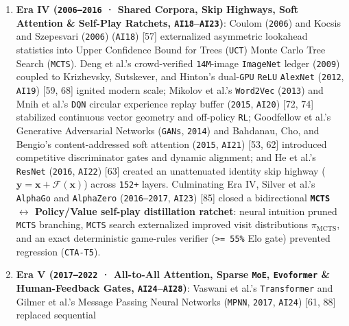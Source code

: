 \documentclass[10pt,letterpaper]{article}
\begin{document}
\begin{enumerate}
  Error Carousel (\texttt{CEC}) protected by multiplicative input,
  forget, and output gates in \([0,1]\) --- \textbf{the exact
  computational analog of a cyanobacterial \texttt{SepJ} nanopore
  (\texttt{CL03})}, sealing stored gradient state against noisy
  read/write perturbations across \texttt{\textgreater{}1,000} recurrent
  steps.
\item
  \textbf{Era IV (\texttt{2006–2016} · Shared Corpora, Skip Highways,
  Soft Attention \& Self-Play Ratchets, \texttt{AI18}--\texttt{AI23})}:
  Coulom (\texttt{2006}) and Kocsis and Szepesvari (\texttt{2006})
  (\texttt{AI18}) {[}57{]} externalized asymmetric lookahead statistics
  into Upper Confidence Bound for Trees (\texttt{UCT}) Monte Carlo Tree
  Search (\texttt{MCTS}). Deng et al.'s crowd-verified
  \texttt{14M}-image \texttt{ImageNet} ledger (\texttt{2009}) coupled to
  Krizhevsky, Sutskever, and Hinton's dual-\texttt{GPU} \texttt{ReLU}
  \texttt{AlexNet} (\texttt{2012}, \texttt{AI19}) {[}59, 68{]} ignited
  modern scale; Mikolov et al.'s \texttt{Word2Vec} (\texttt{2013}) and
  Mnih et al.'s \texttt{DQN} circular experience replay buffer
  (\texttt{2015}, \texttt{AI20}) {[}72, 74{]} stabilized continuous
  vector geometry and off-policy \texttt{RL}; Goodfellow et al.'s
  Generative Adversarial Networks (\texttt{GANs}, \texttt{2014}) and
  Bahdanau, Cho, and Bengio's content-addressed soft attention
  (\texttt{2015}, \texttt{AI21}) {[}53, 62{]} introduced competitive
  discriminator gates and dynamic alignment; and He et al.'s
  \texttt{ResNet} (\texttt{2016}, \texttt{AI22}) {[}63{]} created an
  unattenuated identity skip highway
  (\(\mathbf{y} = \mathbf{x} + \mathcal{F}(\mathbf{x})\)) across
  \texttt{152+} layers. Culminating Era IV, Silver et al.'s
  \texttt{AlphaGo} and \texttt{AlphaZero} (\texttt{2016–2017},
  \texttt{AI23}) {[}85{]} closed a bidirectional \textbf{\texttt{MCTS}
  \(\leftrightarrow\) Policy/Value self-play distillation ratchet}:
  neural intuition pruned \texttt{MCTS} branching, \texttt{MCTS} search
  externalized improved visit distributions \(\pi_{\text{MCTS}}\), and
  an exact deterministic game-rules verifier
  (\texttt{\textgreater{}=\ 55\%} Elo gate) prevented regression
  (\texttt{CTA-T5}).
\item
  \textbf{Era V (\texttt{2017–2022} · All-to-All Attention, Sparse
  \texttt{MoE}, \texttt{Evoformer} \& Human-Feedback Gates,
  \texttt{AI24}--\texttt{AI28})}: Vaswani et al.'s \texttt{Transformer}
  and Gilmer et al.'s Message Passing Neural Networks (\texttt{MPNN},
  \texttt{2017}, \texttt{AI24}) {[}61, 88{]} replaced sequential

\end{enumerate}
\end{document}
